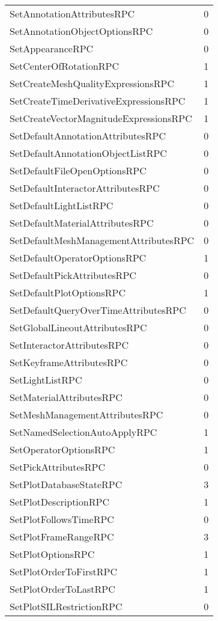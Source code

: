 \documentclass[10pt,a4paper]{report}
\begin{document}
\begin{longtable}{ll}
SetAnnotationAttributesRPC & 0 \\
SetAnnotationObjectOptionsRPC & 0 \\
SetAppearanceRPC & 0 \\
SetCenterOfRotationRPC & 1 \\
SetCreateMeshQualityExpressionsRPC & 1 \\
SetCreateTimeDerivativeExpressionsRPC & 1 \\
SetCreateVectorMagnitudeExpressionsRPC & 1 \\
SetDefaultAnnotationAttributesRPC & 0 \\
SetDefaultAnnotationObjectListRPC & 0 \\
SetDefaultFileOpenOptionsRPC & 0 \\
SetDefaultInteractorAttributesRPC & 0 \\
SetDefaultLightListRPC & 0 \\
SetDefaultMaterialAttributesRPC & 0 \\
SetDefaultMeshManagementAttributesRPC & 0 \\
SetDefaultOperatorOptionsRPC & 1 \\
SetDefaultPickAttributesRPC & 0 \\
SetDefaultPlotOptionsRPC & 1 \\
SetDefaultQueryOverTimeAttributesRPC & 0 \\
SetGlobalLineoutAttributesRPC & 0 \\
SetInteractorAttributesRPC & 0 \\
SetKeyframeAttributesRPC & 0 \\
SetLightListRPC & 0 \\
SetMaterialAttributesRPC & 0 \\
SetMeshManagementAttributesRPC & 0 \\
SetNamedSelectionAutoApplyRPC & 1 \\
SetOperatorOptionsRPC & 1 \\
SetPickAttributesRPC & 0 \\
SetPlotDatabaseStateRPC & 3 \\
SetPlotDescriptionRPC & 1 \\
SetPlotFollowsTimeRPC & 0 \\
SetPlotFrameRangeRPC & 3 \\
SetPlotOptionsRPC & 1 \\
SetPlotOrderToFirstRPC & 1 \\
SetPlotOrderToLastRPC & 1 \\
SetPlotSILRestrictionRPC & 0 \\

\end{longtable}
\end{document}
